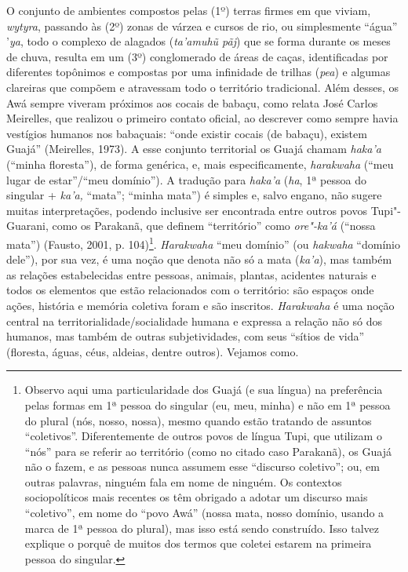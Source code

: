 O conjunto de ambientes compostos pelas (1º) terras firmes em que
viviam, \emph{wytyra}, passando às (2º) zonas de várzea e cursos de rio,
ou simplesmente ``água'' '\emph{ya}, todo o complexo de alagados
(\emph{ta'amuhũ pãj}) que se forma durante os meses de chuva, resulta em
um (3º) conglomerado de áreas de caças, identificadas por diferentes
topônimos e compostas por uma infinidade de trilhas (\emph{pea}) e
algumas clareiras que compõem e atravessam todo o território
tradicional. Além desses, os Awá sempre viveram próximos aos cocais de
babaçu, como relata José Carlos Meirelles, que realizou o primeiro
contato oficial, ao descrever como sempre havia vestígios humanos nos
babaçuais: ``onde existir cocais (de babaçu), existem Guajá''
(Meirelles, 1973). A esse conjunto territorial os Guajá chamam
\emph{haka'a} (``minha floresta''), de forma genérica, e, mais
especificamente, \emph{harakwaha} (``meu lugar de estar''/``meu
domínio''). A tradução para \emph{haka'a} (\emph{ha}, 1ª pessoa do
singular + \emph{ka'a,} ``mata''; ``minha mata'') é simples e, salvo
engano, não sugere muitas interpretações, podendo inclusive ser
encontrada entre outros povos Tupi"-Guarani, como os Parakanã, que
definem ``território'' como \emph{ore"-ka'á} (``nossa mata'') (Fausto,
2001, p. 104)\footnote{Observo aqui uma particularidade dos Guajá (e sua
  língua) na preferência pelas formas em 1ª pessoa do singular (eu, meu,
  minha) e não em 1ª pessoa do plural (nós, nosso, nossa), mesmo quando
  estão tratando de assuntos ``coletivos''. Diferentemente de outros
  povos de língua Tupi, que utilizam o ``nós'' para se referir ao
  território (como no citado caso Parakanã), os Guajá não o fazem, e as
  pessoas nunca assumem esse ``discurso coletivo''; ou, em outras
  palavras, ninguém fala em nome de ninguém. Os contextos sociopolíticos
  mais recentes os têm obrigado a adotar um discurso mais ``coletivo'',
  em nome do ``povo Awá'' (nossa mata, nosso domínio, usando a marca de
  1ª pessoa do plural), mas isso está sendo construído. Isso talvez
  explique o porquê de muitos dos termos que coletei estarem na primeira
  pessoa do singular.}. \emph{Harakwaha} ``meu domínio'' (ou
\emph{hakwaha} ``domínio dele''), por sua vez, é uma noção que denota
não só a mata (\emph{ka'a}), mas também as relações estabelecidas entre
pessoas, animais, plantas, acidentes naturais e todos os elementos que
estão relacionados com o território: são espaços onde ações, história e
memória coletiva foram e são inscritos. \emph{Harakwaha} é uma noção
central na territorialidade/socialidade humana e expressa a relação não
só dos humanos, mas também de outras subjetividades, com seus ``sítios
de vida'' (floresta, águas, céus, aldeias, dentre outros). Vejamos como.

